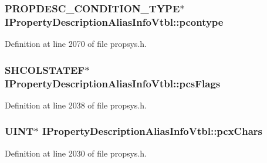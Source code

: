 \subsubsection[{\texorpdfstring{pcontype}{pcontype}}]{ {\bf P\+R\+O\+P\+D\+E\+S\+C\+\_\+\+C\+O\+N\+D\+I\+T\+I\+O\+N\+\_\+\+T\+Y\+PE}$\ast$ I\+Property\+Description\+Alias\+Info\+Vtbl\+::pcontype}\hypertarget{struct_i_property_description_alias_info_vtbl_abb7cadc2601273d23a70cd26790e77c9}{}\label{struct_i_property_description_alias_info_vtbl_abb7cadc2601273d23a70cd26790e77c9}


Definition at line 2070 of file propsys.\+h.

\subsubsection[{\texorpdfstring{pcs\+Flags}{pcsFlags}}]{ {\bf S\+H\+C\+O\+L\+S\+T\+A\+T\+EF}$\ast$ I\+Property\+Description\+Alias\+Info\+Vtbl\+::pcs\+Flags}\hypertarget{struct_i_property_description_alias_info_vtbl_a7ed007fe0665fe48afa0da9251832366}{}\label{struct_i_property_description_alias_info_vtbl_a7ed007fe0665fe48afa0da9251832366}


Definition at line 2038 of file propsys.\+h.

\subsubsection[{\texorpdfstring{pcx\+Chars}{pcxChars}}]{ {\bf U\+I\+NT}$\ast$ I\+Property\+Description\+Alias\+Info\+Vtbl\+::pcx\+Chars}\hypertarget{struct_i_property_description_alias_info_vtbl_adab0d06a2a04e0e67b96db75eadca184}{}\label{struct_i_property_description_alias_info_vtbl_adab0d06a2a04e0e67b96db75eadca184}


Definition at line 2030 of file propsys.\+h.

